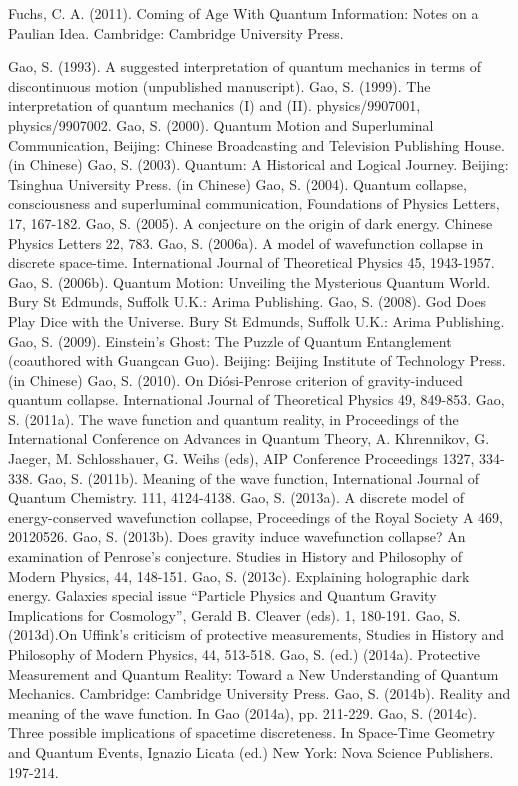 \begin{thebibliography}{}
\bibitem{} Fuchs, C. A. (2011). Coming of Age With Quantum Information: Notes on a Paulian Idea. Cambridge: Cambridge University Press.

\bibitem{} Gao, S. (1993). A suggested interpretation of quantum mechanics in terms of discontinuous motion (unpublished manuscript).
\bibitem{} Gao, S. (1999). The interpretation of quantum mechanics (I) and (II). physics/9907001, physics/9907002.
\bibitem{} Gao, S. (2000). Quantum Motion and Superluminal Communication, Beijing: Chinese Broadcasting and Television Publishing House. (in Chinese)
\bibitem{} Gao, S. (2003). Quantum: A Historical and Logical Journey. Beijing: Tsinghua University Press. (in Chinese)
\bibitem{} Gao, S. (2004). Quantum collapse, consciousness and superluminal communication, Foundations of Physics Letters, 17, 167-182.
\bibitem{} Gao, S. (2005). A conjecture on the origin of dark energy. Chinese Physics Letters 22, 783.
\bibitem{} Gao, S. (2006a). A model of wavefunction collapse in discrete space-time. International Journal of Theoretical Physics 45, 1943-1957.
\bibitem{} Gao, S. (2006b). Quantum Motion: Unveiling the Mysterious Quantum World. Bury St Edmunds, Suffolk U.K.: Arima Publishing.
\bibitem{} Gao, S. (2008). God Does Play Dice with the Universe. Bury St Edmunds, Suffolk U.K.: Arima Publishing. 
\bibitem{} Gao, S. (2009).  Einstein's Ghost: The Puzzle of Quantum Entanglement (coauthored with Guangcan Guo). Beijing: Beijing Institute of Technology Press. (in Chinese)
\bibitem{} Gao, S. (2010). On Di\'{o}si-Penrose criterion of gravity-induced quantum collapse. International Journal of Theoretical Physics 49, 849-853.
\bibitem{} Gao, S. (2011a). The wave function and quantum reality, in Proceedings of the International Conference on Advances in Quantum Theory, A. Khrennikov, G. Jaeger, M. Schlosshauer, G. Weihs (eds), AIP Conference Proceedings 1327, 334-338.
\bibitem{} Gao, S. (2011b). Meaning of the wave function, International Journal of Quantum Chemistry. 111, 4124-4138.
\bibitem{} Gao, S. (2013a). A discrete model of energy-conserved wavefunction collapse, Proceedings of the Royal Society A 469, 20120526.
\bibitem{} Gao, S. (2013b). Does gravity induce wavefunction collapse? An examination of Penrose's conjecture. Studies in History and Philosophy of Modern Physics, 44, 148-151.
\bibitem{} Gao, S. (2013c). Explaining holographic dark energy. Galaxies special issue ``Particle Physics and Quantum Gravity Implications for Cosmology'', Gerald B. Cleaver (eds). 1, 180-191.
\bibitem{} Gao, S. (2013d).On Uffink's criticism of protective measurements, Studies in History and Philosophy of Modern Physics, 44, 513-518.
\bibitem{} Gao, S. (ed.) (2014a). Protective Measurement and Quantum Reality: Toward a New Understanding of Quantum Mechanics. Cambridge: Cambridge University Press.
\bibitem{} Gao, S. (2014b). Reality and meaning of the wave function. In Gao (2014a), pp. 211-229.
\bibitem{} Gao, S. (2014c). Three possible implications of spacetime discreteness. In Space-Time Geometry and Quantum Events, Ignazio Licata (ed.) New York: Nova Science Publishers. 197-214.


\end{thebibliography}
